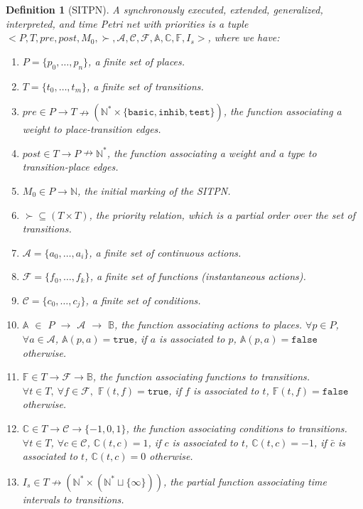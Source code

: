\documentclass[pdflatex,sn-mathphys]{sn-jnl}%
\theoremstyle{thmstyleone}%
\theoremstyle{thmstyletwo}%
\theoremstyle{thmstylethree}%
\newtheorem{definition}{Definition}%
\begin{document}
\begin{definition}[SITPN]
  \label{def:sitpn}
  A synchronously executed, extended, generalized, interpreted, and
  time Petri net with priorities is a tuple
  ${<}P,T,pre,post,M_0,{\succ},\mathcal{A},\mathcal{C},\mathcal{F},
  \mathbb{A},\mathbb{C},\mathbb{F},{I_s}{>}$, where we have:
  \begin{enumerate}
  \item $P=\{p_0,\ldots,p_n\}$, a finite set of places.
  \item $T=\{t_0,\ldots,t_m\}$, a finite set of transitions.
  \item
    $pre\in{}P\rightarrow{}T\nrightarrow(\mathbb{N}^{*}\times\{\mathtt{basic},\mathtt{inhib},\mathtt{test}\})$,
    the function associating a weight to place-transition edges.
  \item $post\in{}T\rightarrow{}P\nrightarrow\mathbb{N}^{*}$, the
    function associating a weight and a type to transition-place
    edges.
  \item $M_0\in{}P\rightarrow\mathbb{N}$, the initial marking of the SITPN.
  \item $\succ\subseteq{}(T\times{}T)$, the priority relation, which is
    a partial order over the set of transitions.
  \item $\mathcal{A}=\{a_0,\ldots,a_i\}$, a finite set of continuous actions.
  \item $\mathcal{F}=\{f_0,\ldots,f_k\}$, a finite set of functions
    (instantaneous actions).
  \item $\mathcal{C}=\{c_0,\ldots,c_j\}$, a finite set of conditions.
  \item $\mathbb{A}$ $\in$ ${}P$ $\rightarrow$ $\mathcal{A}$
    $\rightarrow$ $\mathbb{B}$, the function associating actions to
    places.  $\forall{}p\in{}P$, $\forall{}a\in\mathcal{A}$,
    $\mathbb{A}(p,a)=\mathtt{true}$, if $a$ is associated to $p$,
    $\mathbb{A}(p,a)=\mathtt{false}$ otherwise.
  \item $\mathbb{F}\in{}T\rightarrow\mathcal{F}\rightarrow\mathbb{B}$,
    the function associating functions to transitions.
    $\forall{}t\in{}T,~\forall{}f\in\mathcal{F},$
    $\mathbb{F}(t,f)=\mathtt{true}$, if $f$ is associated to $t$,
    $\mathbb{F}(t,f)=\mathtt{false}$ otherwise.
    
  \item $\mathbb{C} \in T \rightarrow \mathcal{C} \rightarrow\{-1,0,1\}$, the
    function associating conditions to transitions.
    $\forall t \in T$, $\forall c \in \mathcal{C}$,
    $\mathbb{C}(t,c)=1$, if $c$ is associated to $t$,
    $\mathbb{C}(t,c)=-1$, if $\bar{c}$ is associated to $t$,
    $\mathbb{C}(t,c)=0$ otherwise.
  \item
    $I_s\in{}T\nrightarrow(\mathbb{N}^{*}\times(\mathbb{N^{*}}\sqcup\{\infty\}))$,
    the partial function associating time intervals to transitions.
  \end{enumerate}
\end{definition}
\end{document}
